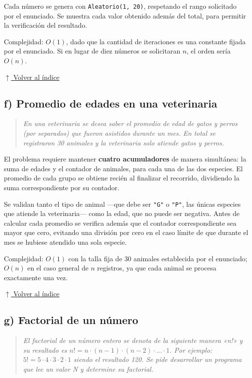 \documentclass[12pt]{article}
\newcommand{\codigo}[1]{\texttt{\small #1}}
\newcommand{\pseudocodigo}[2]{%
}
\newcommand{\volverindice}{%
    \vspace{1em}%
    \begin{flushright}%
        \hyperlink{indice}{\small $\uparrow$ Volver al índice}%
    \end{flushright}%
}
\newcommand{\enunciado}[1]{%
    \begin{quote}
        \itshape #1
    \end{quote}
}
\begin{document}
Cada número se genera con \codigo{Aleatorio(1, 20)}, respetando el rango solicitado por el enunciado. Se muestra cada valor obtenido además del total, para permitir la verificación del resultado.

\pseudocodigo{ej08_e_sumatoria_azar}{Sumatoria de 10 números aleatorios en el rango [1..20]}

Complejidad: $O(1)$, dado que la cantidad de iteraciones es una constante fijada por el enunciado. Si en lugar de diez números se solicitaran $n$, el orden sería $O(n)$.

\volverindice
\newpage

\subsection{f) Promedio de edades en una veterinaria}

\enunciado{En una veterinaria se desea saber el promedio de edad de gatos y perros (por separados) que fueron asistidos durante un mes. En total se registraron 30 animales y la veterinaria solo atiende gatos y perros.}

El problema requiere mantener \textbf{cuatro acumuladores} de manera simultánea: la suma de edades y el contador de animales, para cada una de las dos especies. El promedio de cada grupo se obtiene recién al finalizar el recorrido, dividiendo la suma correspondiente por su contador.

Se validan tanto el tipo de animal —que debe ser \codigo{"G"} o \codigo{"P"}, las únicas especies que atiende la veterinaria— como la edad, que no puede ser negativa. Antes de calcular cada promedio se verifica además que el contador correspondiente sea mayor que cero, evitando una división por cero en el caso límite de que durante el mes se hubiese atendido una sola especie.

\pseudocodigo{ej08_f_veterinaria_promedios}{Promedio de edad de gatos y perros atendidos en un mes}

Complejidad: $O(1)$ con la talla fija de 30 animales establecida por el enunciado; $O(n)$ en el caso general de $n$ registros, ya que cada animal se procesa exactamente una vez.

\volverindice
\newpage

\subsection{g) Factorial de un número}

\enunciado{El factorial de un número entero se denota de la siguiente manera «n!» y su resultado es $n! = n \cdot (n-1) \cdot (n-2) \cdot \ldots \cdot 1$. Por ejemplo: $5! = 5 \cdot 4 \cdot 3 \cdot 2 \cdot 1$ siendo el resultado 120. Se pide desarrollar un programa que lee un valor N y determine su factorial.}
\end{document}
